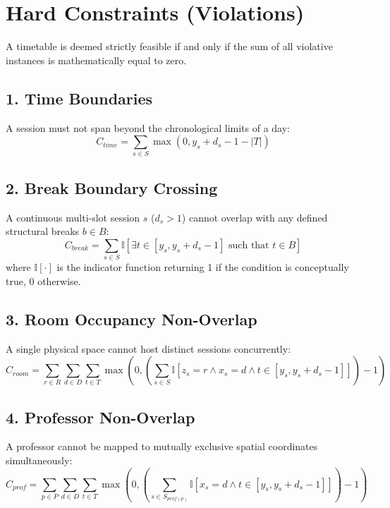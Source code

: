 \documentclass[12pt,a4paper]{article}
\begin{document}
\section{Hard Constraints (Violations)}
A timetable is deemed strictly feasible if and only if the sum of all violative instances is mathematically equal to zero.

\subsection{1. Time Boundaries}
A session must not span beyond the chronological limits of a day:
\begin{equation}
    C_{time} = \sum_{s \in S} \max(0, y_s + d_s - 1 - |T|)
\end{equation}

\subsection{2. Break Boundary Crossing}
A continuous multi-slot session $s$ ($d_s > 1$) cannot overlap with any defined structural breaks $b \in B$:
\begin{equation}
    C_{break} = \sum_{s \in S} \mathbb{I} \left[ \exists t \in [y_s, y_s + d_s - 1] \text{ such that } t \in B \right]
\end{equation}
where $\mathbb{I}[\cdot]$ is the indicator function returning 1 if the condition is conceptually true, 0 otherwise.

\subsection{3. Room Occupancy Non-Overlap}
A single physical space cannot host distinct sessions concurrently:
\begin{equation}
    C_{room} = \sum_{r \in R} \sum_{d \in D} \sum_{t \in T} \max\left(0, \left(\sum_{s \in S} \mathbb{I}[z_s = r \land x_s = d \land t \in [y_s, y_s + d_s - 1]]\right) - 1\right)
\end{equation}

\subsection{4. Professor Non-Overlap}
A professor cannot be mapped to mutually exclusive spatial coordinates simultaneously:
\begin{equation}
    C_{prof} = \sum_{p \in P} \sum_{d \in D} \sum_{t \in T} \max\left(0, \left(\sum_{s \in S_{prof(p)}} \mathbb{I}[x_s = d \land t \in [y_s, y_s + d_s - 1]]\right) - 1\right)
\end{equation}
\end{document}
